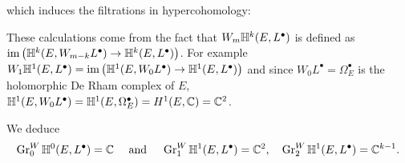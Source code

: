 \documentclass[../main.tex]{subfiles}
\begin{document}
\begin{es}
which induces the filtrations in hypercohomology:
\begin{center}
\begin{minipage}[c][0.2\textheight]{0.45\textwidth}
\end{minipage}%
\begin{minipage}[c][0.2\textheight]{0.45\textwidth}
\end{minipage}
\end{center}
These calculations come from the fact that $ W_m \mathbb{H}^k(E,L^\bullet)$ is defined as $\operatorname{im} \left( \mathbb{H}^k(E,W_{m-k}L^\bullet) \to \mathbb{H}^k(E,L^\bullet) \right)$.
For example $ W_1 \mathbb{H}^1(E,L^\bullet) = \operatorname{im} \left( \mathbb{H}^1(E,W_{0}L^\bullet) \to \mathbb{H}^1(E,L^\bullet) \right) $ and since $W_{0}L^\bullet = \Omega^\bullet_{E}$ is the holomorphic De Rham complex of $E$, $\mathbb{H}^1(E,W_{0}L^\bullet) = \mathbb{H}^1(E,\Omega^\bullet_{E}) = H^1(E,\mathbb{C})=\mathbb{C}^2$.


We deduce 
\begin{equation} \label{GRW}
\operatorname{Gr}_0^W \mathbb{H}^0(E,L^\bullet) = \mathbb{C}  \quad \text{ and } \quad \operatorname{Gr}_1^W \mathbb{H}^1(E,L^\bullet) = \mathbb{C}^{2},  \quad \operatorname{Gr}_2^W \mathbb{H}^1(E,L^\bullet) = \mathbb{C}^{k-1} .
\end{equation}



\end{es}
\end{document}
